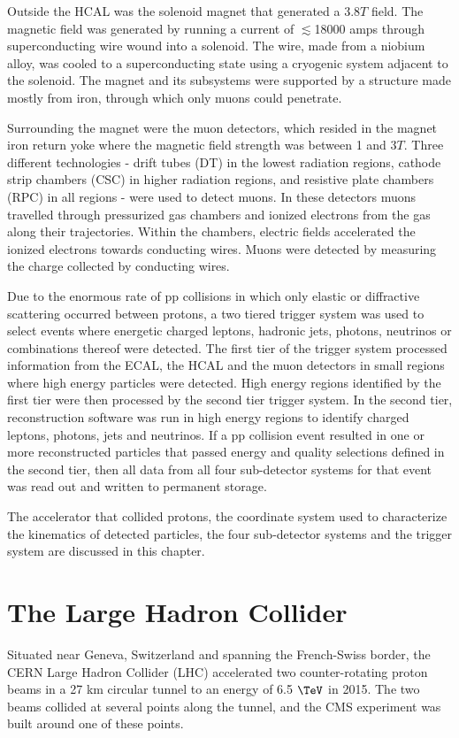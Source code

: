 Outside the HCAL was the solenoid magnet that generated a 3.8$\unit{T}$ field.  The magnetic field was generated by running a current of 
$\lesssim$18000 amps through superconducting wire wound into a solenoid.  The wire, made from a niobium alloy, was 
cooled to a superconducting state using a cryogenic system adjacent to the solenoid.  The magnet and its subsystems 
were supported by a structure made mostly from iron, through which only muons could penetrate.

Surrounding the magnet were the muon detectors, which resided 
in the magnet iron return yoke where the magnetic field strength was between 1 and 3$\unit{T}$.  Three 
different technologies - drift tubes (DT) in the lowest radiation regions, cathode strip chambers (CSC) in higher 
radiation regions, and resistive plate chambers (RPC) in all regions - were used to detect muons.  In these detectors 
muons travelled through pressurized gas chambers and ionized electrons from the gas along their 
trajectories.  Within the chambers, electric fields accelerated the ionized electrons towards conducting wires.  Muons 
were detected by measuring the charge collected by conducting wires.

Due to the enormous rate of pp collisions in which only elastic or diffractive scattering occurred between protons, a two tiered trigger 
system was used to select events where energetic charged leptons, hadronic jets, photons, neutrinos or combinations 
thereof were detected.  The first tier of the trigger system processed information from the ECAL, the HCAL and the muon 
detectors in small regions where high energy particles were detected.  High energy regions identified by the first tier 
were then processed by the second tier trigger system.  In the second tier, reconstruction software 
was run in high energy regions to identify charged leptons, photons, jets and neutrinos.  If a pp collision event resulted in 
one or more reconstructed particles that passed energy and quality selections defined in the second tier, then all data 
from all four sub-detector systems for that event was read out and written to permanent storage.

The accelerator that collided protons, the coordinate system used to characterize the kinematics of detected 
particles, the four sub-detector systems and the trigger system are discussed in this chapter.

\section{The Large Hadron Collider}
\label{sec:lhcDescription}
Situated near Geneva, Switzerland and spanning the French-Swiss border, the CERN Large Hadron Collider (LHC) accelerated 
two counter-rotating proton beams in a 27 km circular tunnel \cite{lhcTDR} to an energy of 6.5 $\TeV$ in 2015.  The two beams 
collided at several points along the tunnel, and the CMS experiment was built around one of these points.

